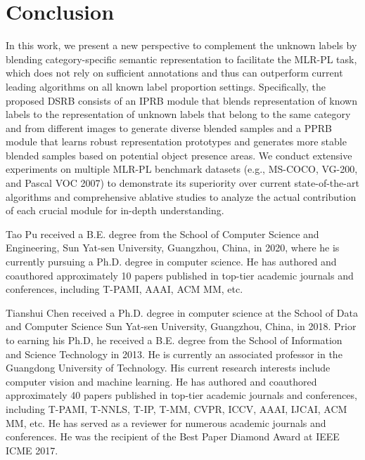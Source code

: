 \documentclass[lettersize,journal]{IEEEtran}
\begin{document}
\section{Conclusion} \label{sec:conclusion}
In this work, we present a new perspective to complement the unknown labels by blending category-specific semantic representation to facilitate the MLR-PL task, which does not rely on sufficient annotations and thus can outperform current leading algorithms on all known label proportion settings. Specifically, the proposed DSRB consists of an IPRB module that blends representation of known labels to the representation of unknown labels that belong to the same category and from different images to generate diverse blended samples and a PPRB module that learns robust representation prototypes and generates more stable blended samples based on potential object presence areas. We conduct extensive experiments on multiple MLR-PL benchmark datasets (e.g., MS-COCO, VG-200, and Pascal VOC 2007) to demonstrate its superiority over current state-of-the-art algorithms and comprehensive ablative studies to analyze the actual contribution of each crucial module for in-depth understanding.




\newpage

\begin{IEEEbiography}{Tao Pu} received a B.E. degree from the School of Computer Science and Engineering, Sun Yat-sen University, Guangzhou, China, in 2020, where he is currently pursuing a Ph.D. degree in computer science. He has authored and coauthored approximately 10 papers published in top-tier academic journals and conferences, including T-PAMI, AAAI, ACM MM, etc.\end{IEEEbiography}

\begin{IEEEbiography}{Tianshui Chen} received a Ph.D. degree in computer science at the School of Data and Computer Science Sun Yat-sen University, Guangzhou, China, in 2018. Prior to earning his Ph.D, he received a B.E. degree from the School of Information and Science Technology in 2013. He is currently an associated professor in the Guangdong University of Technology. His current research interests include computer vision and machine learning. He has authored and coauthored approximately 40 papers published in top-tier academic journals and conferences, including T-PAMI, T-NNLS, T-IP, T-MM, CVPR, ICCV, AAAI, IJCAI, ACM MM, etc. He has served as a reviewer for numerous academic journals and conferences. He was the recipient of the Best Paper Diamond Award at IEEE ICME 2017. \end{IEEEbiography}
\end{document}
